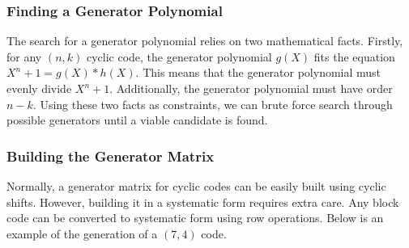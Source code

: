 \documentclass{article}
\begin{document}
\subsubsection{Finding a Generator Polynomial}
The search for a generator polynomial relies on two mathematical facts. Firstly, for any $(n, k)$ cyclic code, the generator polynomial $g(X)$ fits the equation $X^n+1 = g(X)*h(X)$. This means that the generator polynomial must evenly divide $X^n+1$.  Additionally, the generator polynomial must have order $n-k$. Using these two facts as constraints, we can brute force search through possible generators until  a viable candidate is found.
\subsubsection{Building the Generator Matrix}
Normally, a generator matrix for cyclic codes can be easily built using cyclic shifts. However, building it in a systematic form requires extra care. Any block code can be converted to systematic form using row operations. Below is an example of the generation of a $(7,4)$ code.
\end{document}
